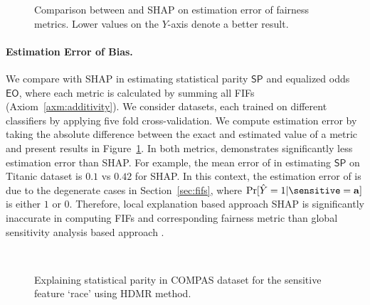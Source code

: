 \begin{figure}
	\centering
	
	\caption{Comparison between {\framework} and SHAP on estimation error of fairness metrics. Lower values on the $ Y $-axis denote a better result. }
	\label{fig:estimation_error}
\end{figure}


\paragraph{Estimation Error of Bias.} We compare {\framework} with SHAP in estimating statistical parity $ \mathsf{SP} $ and equalized odds $ \mathsf{EO} $, where each metric is calculated by summing all FIFs (Axiom~\ref{axm:additivity}). We consider  datasets, each trained on  different classifiers by applying five fold cross-validation. We compute estimation error by taking the absolute difference between the exact and  estimated value of a metric and present results in Figure~\ref{fig:estimation_error}. In both metrics, {\framework} demonstrates significantly less estimation error than SHAP. For example, the mean error of {\framework} in estimating $ \mathsf{SP} $ on Titanic dataset is $ 0.1 $ vs $ 0.42 $ for SHAP. In this context, the estimation error of {\framework} is due to the degenerate cases in Section~\ref{sec:fifs}, where $ \Pr[\hat{Y} = 1 | \sensitive = \mathbf{a}] $ is either $ 1 $ or $ 0 $.  Therefore, local explanation based approach SHAP is significantly inaccurate in computing FIFs and corresponding fairness metric than global sensitivity analysis based approach {\framework}.


\begin{figure}
	\centering
	\\
	\caption{Explaining statistical parity in COMPAS dataset for the sensitive feature `race' using HDMR method. }
	\label{fig:individual_vs_intersectional_influence}
\end{figure}



